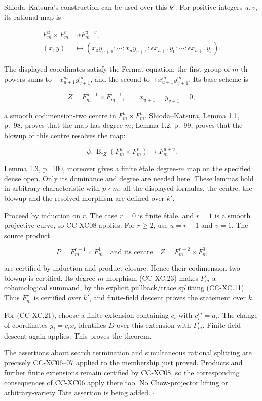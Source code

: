 Shioda--Katsura's construction can be used over this \(k'\). For
positive integers \(u,v\), its rational map is

\[
 \begin{split}
 F_m^u\times F_m^v&\dashrightarrow F_m^{u+v},\\
 (x,y)&\longmapsto
 (x_0y_{v+1}:\cdots:x_uy_{v+1}:
   \epsilon x_{u+1}y_0:\cdots:\epsilon x_{u+1}y_v).
 \end{split}
 \tag{CC-XC.22}
\]

The displayed coordinates satisfy the Fermat equation: the first group
of \(m\)-th powers sums to \(-x_{u+1}^m y_{v+1}^m\), and the second to
\(+x_{u+1}^m y_{v+1}^m\). Its base scheme is

\[
 Z=F_m^{u-1}\times F_m^{v-1},
 \qquad x_{u+1}=y_{v+1}=0,
\]

a smooth codimension-two centre in \(F_m^u\times F_m^v\).
Shioda--Katsura, Lemma 1.1, p.~98, proves that the map has degree \(m\);
Lemma 1.2, p.~99, proves that the blowup of this centre resolves the
map:

\[
 \psi:\operatorname{Bl}_{Z}(F_m^u\times F_m^v)
       \longrightarrow F_m^{u+v}.
 \tag{CC-XC.23}
\]

Lemma 1.3, p.~100, moreover gives a finite étale degree-\(m\) map on the
specified dense open. Only its dominance and degree are needed here.
These lemmas hold in arbitrary characteristic with \(p\nmid m\); all the
displayed formulas, the centre, the blowup and the resolved morphism are
defined over \(k'\).

Proceed by induction on \(r\). The case \(r=0\) is finite étale, and
\(r=1\) is a smooth projective curve, so CC-XC08 applies. For \(r\ge2\),
use \(u=r-1\) and \(v=1\). The source product

\[
 P=F_m^{r-1}\times F_m^1
 \quad\text{and its centre}\quad
 Z=F_m^{r-2}\times F_m^0
\]

are certified by induction and product closure. Hence their
codimension-two blowup is certified. Its degree-\(m\) morphism
(CC-XC.23) makes \(F_m^r\) a cohomological summand, by the explicit
pullback/trace splitting (CC-XC.11). Thus \(F_m^r\) is certified over
\(k'\), and finite-field descent proves the statement over \(k\).

For (CC-XC.21), choose a finite extension containing \(c_i\) with
\(c_i^m=a_i\). The change of coordinates \(y_i=c_i x_i\) identifies
\(D\) over this extension with \(F_m^r\). Finite-field descent again
applies. This proves the theorem.

The assertions about search termination and simultaneous rational
splitting are precisely CC-XC06--07 applied to the membership just
proved. Products and further finite extensions remain certified by
CC-XC08, so the corresponding consequences of CC-XC06 apply there too.
No Chow-projector lifting or arbitrary-variety Tate assertion is being
added. \(\square\)

